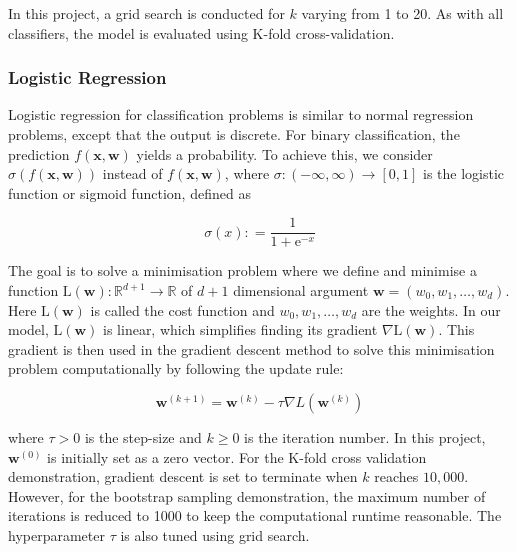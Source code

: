 \documentclass[12pt]{article}
\begin{document}
In this project, a grid search is conducted for \( k \) varying from 1 to 20. 
As with all classifiers, the model is evaluated using K-fold cross-validation.




\subsubsection{Logistic Regression\cite{BenningPerra2023}}


\indent Logistic regression for classification problems is similar to normal regression problems, except that the output is discrete. For binary classification, the prediction \( f(\mathbf{x}, \mathbf{w}) \) yields a probability. To achieve this, we consider \( \sigma(f(\mathbf{x}, \mathbf{w})) \) instead of \( f(\mathbf{x}, \mathbf{w}) \), where \( \sigma: (-\infty, \infty) \to [0, 1] \) is the logistic function or sigmoid function, defined as



\vspace{-12pt}

$$
\sigma(x): = \frac{1}{1+\mathrm{e}^{-x}}
$$


The goal is to solve a minimisation problem where we define and minimise a function $\mathrm{L}\left(\mathbf{w}\right): \mathbb{R}^{d+1} \to \mathbb{R}$ of $d+1$ dimensional argument $\mathbf{w}=\left(w_0,w_1,\ldots,w_{d}\right)$. Here $\mathrm{L}\left(\mathbf{w}\right)$ is called the cost function and $w_0,w_1,\ldots,w_{d}$ are the weights. 
In our model, $\mathrm{L}\left(\mathbf{w}\right)$ is linear, which simplifies finding its gradient $\nabla \mathrm{L}\left(\mathbf{w}\right)$. 
This gradient is then used in the gradient descent method to solve this minimisation problem computationally by following the update rule:


\vspace{-6pt}

$$
\mathbf{w}^{(k+1)} = \mathbf{w}^{(k)} - \tau \nabla L\left(\mathbf{w}^{(k)}\right)
$$

\vspace{-6pt}

\noindent where $\tau > 0$ is the step-size and $k\geq 0$ is the iteration number. 
In this project, $\mathbf{w}^{(0)}$ is initially set as a zero vector. %
For the K-fold cross validation demonstration, gradient descent is set to terminate when $k$ reaches $10,000$.
However, for the bootstrap sampling demonstration, 
the maximum number of iterations is reduced to 1000 to 
keep the computational runtime reasonable. %
The hyperparameter $\tau$ is also tuned using grid search.
\end{document}
